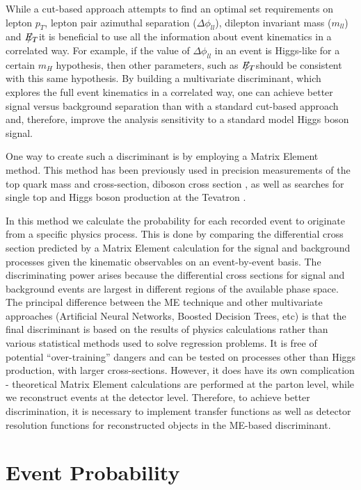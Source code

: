 \documentclass{cmspaper}
\newcommand{\met}{\mbox{$E_T\hspace{-1.1em}/$\hspace{0.7em}}}
\begin{document}
While a cut-based approach attempts to find an optimal set requirements on lepton $p_{T}$, lepton pair azimuthal separation ($\Delta\phi_{ll}$), 
dilepton invariant mass  ($m_{ll}$) and \met, it is beneficial to use all the information about event kinematics in a correlated way. 
For example, if the value of $\Delta\phi_{ll}$ in an event is Higgs-like for a certain $m_{H}$ hypothesis, then other parameters, such as  
\met, should be consistent with this same hypothesis. By building a multivariate discriminant, which explores the full event kinematics
in a correlated way, one can achieve better signal versus background separation than with a standard cut-based approach and, 
therefore, improve the analysis sensitivity to a standard model Higgs boson signal.

One way to create such a discriminant is by employing a Matrix Element method. This method has been previously used in precision
measurements of the top quark mass \cite{ref:CDFTopMass,ref:D0TopMass} and cross-section, diboson cross section \cite{ref:CDFDiboson}, 
as well as searches for single top \cite{ref:CDFSingleTop,ref:D0SingleTop} and Higgs boson production at the Tevatron \cite{ref:CDFHiggs,ref:D0Higgs}.

In this method we calculate the probability for each recorded event to originate from a specific physics process.  
This is done by comparing the differential cross section predicted by a Matrix Element calculation for the signal and background processes given the kinematic observables
on an event-by-event basis. The discriminating power arises because the differential cross sections for signal and background
events are largest in different regions of the available phase space. The principal difference between the ME technique and other
multivariate approaches (Artificial Neural Networks, Boosted Decision Trees, etc) is that the final discriminant is based on the results
of physics calculations rather than various statistical methods used to solve regression problems. It is free of potential ``over-training''
dangers and can be tested on processes other than Higgs production, with larger cross-sections. However, it does have its own complication - 
theoretical Matrix Element calculations are performed at the parton level, while we reconstruct events at the detector level. 
Therefore, to achieve better discrimination, it is necessary to implement transfer functions as well as detector resolution functions for
reconstructed objects in the ME-based discriminant.

\section{Event Probability}
\label{sec:Evt_Prob}
\end{document}
